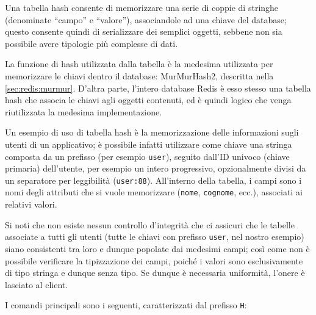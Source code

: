 Una tabella hash consente di memorizzare una serie di coppie di stringhe (denominate ``campo'' e
``valore''), associandole ad una chiave del database; questo consente quindi di serializzare dei
semplici oggetti, sebbene non sia possibile avere tipologie più complesse di dati.

La funzione di hash utilizzata dalla tabella è la medesima utilizzata per memorizzare le chiavi
dentro il database: MurMurHash2, descritta nella \autoref{sec:redis:murmur}. D'altra parte, l'intero
database Redis è esso stesso una tabella hash che associa le chiavi agli oggetti contenuti, ed è
quindi logico che venga riutilizzata la medesima implementazione.

Un esempio di uso di tabella hash è la memorizzazione delle informazioni sugli utenti di un
applicativo; è possibile infatti utilizzare come chiave una stringa composta da un prefisso (per
esempio \verb|user|), seguito dall'ID univoco (chiave primaria) dell'utente, per esempio un intero
progressivo, opzionalmente divisi da un separatore per leggibilità (\verb|user:88|). All'interno
della tabella, i campi sono i nomi degli attributi che si vuole memorizzare (\verb|nome|,
\verb|cognome|, ecc.), associati ai relativi valori.

Si noti che non esiste nessun controllo d'integrità che ci assicuri che le tabelle associate a tutti
gli utenti (tutte le chiavi con prefisso \verb|user|, nel nostro esempio) siano consistenti tra loro
e dunque popolate dai medesimi campi; così come non è possibile verificare la tipizzazione dei
campi, poiché i valori sono esclusivamente di tipo stringa e dunque senza tipo. Se dunque è
necessaria uniformità, l'onere è lasciato al client.

I comandi principali sono i seguenti, caratterizzati dal prefisso \verb|H|:

